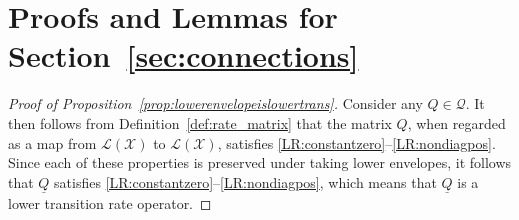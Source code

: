 \documentclass[10pt]{paper}
\theoremstyle{definition}
\newcommand{\states}{\mathcal{X}}
\newcommand{\gambles}{\mathcal{L}}
\newcommand{\gamblesX}{\gambles(\states)}
\newcommand{\rateset}{\mathcal{Q}}
\newcommand{\lrate}{\underline{Q}}
\begin{document}
\section{Proofs and Lemmas for Section~\ref{sec:connections}}

\begin{proof}[Proof of Proposition~\ref{prop:lowerenvelopeislowertrans}]
Consider any $Q\in\rateset$. It then follows from Definition~\ref{def:rate_matrix} that the matrix $Q$, when regarded as a map from $\gamblesX$ to $\gamblesX$, satisfies \ref{LR:constantzero}--\ref{LR:nondiagpos}. Since each of these properties is preserved under taking lower envelopes, it follows that $\lrate$ satisfies \ref{LR:constantzero}--\ref{LR:nondiagpos}, which means that $\lrate$ is a lower transition rate operator.
\end{proof}
\end{document}
